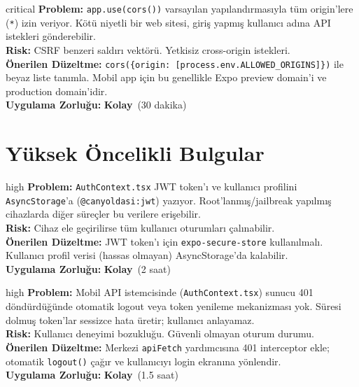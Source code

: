\documentclass[12pt,a4paper]{article}
\newcommand{\EASY}{\textcolor{low}{\textbf{Kolay}}}
\begin{document}
\begin{auditbox}{critical}
\textbf{Problem:} \texttt{app.use(cors())} varsayılan yapılandırmasıyla tüm origin'lere (\texttt{*}) izin veriyor. Kötü niyetli bir web sitesi, giriş yapmış kullanıcı adına API istekleri gönderebilir.\\[0.3em]
\textbf{Risk:} CSRF benzeri saldırı vektörü. Yetkisiz cross-origin istekleri.\\[0.3em]
\textbf{Önerilen Düzeltme:} \texttt{cors(\{origin: [process.env.ALLOWED\_ORIGINS]\})} ile beyaz liste tanımla. Mobil app için bu genellikle Expo preview domain'i ve production domain'idir.\\[0.3em]
\textbf{Uygulama Zorluğu:} \EASY\ (30 dakika)
\end{auditbox}

\section{Yüksek Öncelikli Bulgular}

\begin{auditbox}{high}
\textbf{Problem:} \texttt{AuthContext.tsx} JWT token'ı ve kullanıcı profilini \texttt{AsyncStorage}'a (\texttt{@canyoldasi:jwt}) yazıyor. Root'lanmış/jailbreak yapılmış cihazlarda diğer süreçler bu verilere erişebilir.\\[0.3em]
\textbf{Risk:} Cihaz ele geçirilirse tüm kullanıcı oturumları çalınabilir.\\[0.3em]
\textbf{Önerilen Düzeltme:} JWT token'ı için \texttt{expo-secure-store} kullanılmalı. Kullanıcı profil verisi (hassas olmayan) AsyncStorage'da kalabilir.\\[0.3em]
\textbf{Uygulama Zorluğu:} \EASY\ (2 saat)
\end{auditbox}

\begin{auditbox}{high}
\textbf{Problem:} Mobil API istemcisinde (\texttt{AuthContext.tsx}) sunucu 401 döndürdüğünde otomatik logout veya token yenileme mekanizması yok. Süresi dolmuş token'lar sessizce hata üretir; kullanıcı anlayamaz.\\[0.3em]
\textbf{Risk:} Kullanıcı deneyimi bozukluğu. Güvenli olmayan oturum durumu.\\[0.3em]
\textbf{Önerilen Düzeltme:} Merkezi \texttt{apiFetch} yardımcısına 401 interceptor ekle; otomatik \texttt{logout()} çağır ve kullanıcıyı login ekranına yönlendir.\\[0.3em]
\textbf{Uygulama Zorluğu:} \EASY\ (1.5 saat)
\end{auditbox}
\end{document}
